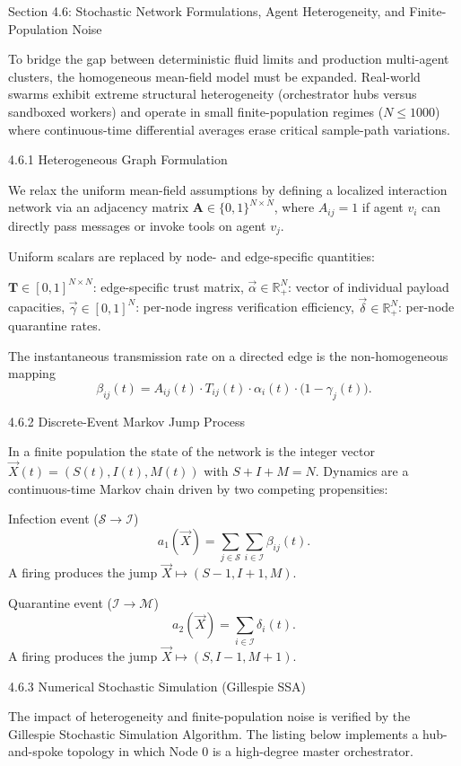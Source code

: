 Section 4.6: Stochastic Network Formulations, Agent Heterogeneity, and Finite-Population Noise

To bridge the gap between deterministic fluid limits and production multi-agent clusters, the homogeneous mean-field model must be expanded. Real-world swarms exhibit extreme structural heterogeneity (orchestrator hubs versus sandboxed workers) and operate in small finite-population regimes (\(N\le 1000\)) where continuous-time differential averages erase critical sample-path variations.

4.6.1 Heterogeneous Graph Formulation

We relax the uniform mean-field assumptions by defining a localized interaction network via an adjacency matrix \(\mathbf{A}\in\{0,1\}^{N\times N}\), where \(A_{ij}=1\) if agent \(v_i\) can directly pass messages or invoke tools on agent \(v_j\).

Uniform scalars are replaced by node- and edge-specific quantities:

\(\mathbf{T}\in[0,1]^{N\times N}\): edge-specific trust matrix,
\(\vec{\alpha}\in\mathbb{R}_+^N\): vector of individual payload capacities,
\(\vec{\gamma}\in[0,1]^N\): per-node ingress verification efficiency,
\(\vec{\delta}\in\mathbb{R}_+^N\): per-node quarantine rates.

The instantaneous transmission rate on a directed edge is the non-homogeneous mapping
\[
\beta_{ij}(t)=A_{ij}(t)\cdot T_{ij}(t)\cdot\alpha_i(t)\cdot\bigl(1-\gamma_j(t)\bigr).
\]

4.6.2 Discrete-Event Markov Jump Process

In a finite population the state of the network is the integer vector \(\vec{X}(t)=(S(t),I(t),M(t))\) with \(S+I+M=N\). Dynamics are a continuous-time Markov chain driven by two competing propensities:

Infection event (\(\mathcal{S}\to\mathcal{I}\))  
   \[
   a_1(\vec{X})=\sum_{j\in\mathcal{S}}\sum_{i\in\mathcal{I}}\beta_{ij}(t).
   \]
   A firing produces the jump \(\vec{X}\mapsto(S-1,I+1,M)\).

Quarantine event (\(\mathcal{I}\to\mathcal{M}\))  
   \[
   a_2(\vec{X})=\sum_{i\in\mathcal{I}}\delta_i(t).
   \]
   A firing produces the jump \(\vec{X}\mapsto(S,I-1,M+1)\).

4.6.3 Numerical Stochastic Simulation (Gillespie SSA)

The impact of heterogeneity and finite-population noise is verified by the Gillespie Stochastic Simulation Algorithm. The listing below implements a hub-and-spoke topology in which Node 0 is a high-degree master orchestrator.

